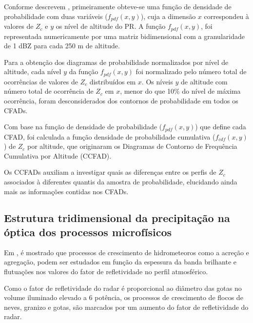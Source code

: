 Conforme descrevem , primeiramente obteve-se uma função de densidade de probabilidade com duas variáveis ($f_{pdf}(x,y)$), cuja a dimensão $x$ correspondeu à valores de $Z_{c}$ e $y$ os nível de altitude do PR. A função $f_{pdf}(x,y)$, foi representada numericamente por uma matriz bidimensional com a granularidade de 1 dBZ para cada 250 m de altitude.



Para a obtenção dos diagramas de probabilidade normalizados por nível de altitude, cada nível $y$ da função $f_{pdf}(x,y)$ foi normalizado pelo número total de ocorrências de valores de $Z_c$ distribuídos em $x$. Os níveis $y$ de altitude com número total de ocorrência de $Z_c$ em $x$, menor do que 10\% do nível de máxima ocorrência, foram desconsiderados dos contornos de probabilidade em todos os CFADs.


Com base na função de densidade de probabilidade ($f_{pdf}(x,y)$) que define cada CFAD, foi calculada a função densidade de probabilidade cumulativa ($f_{cdf}(x,y)$) de $Z_c$ por altitude, que originaram os Diagramas de Contorno de Frequência Cumulativa por Altitude (CCFAD).     



Os CCFADs auxiliam a investigar quais as diferenças entre os perfis de $Z_c$ associados à diferentes quantis da amostra de probabilidade, elucidando ainda mais as informações contidas nos CFADs.


\subsection{Estrutura tridimensional da precipitação na óptica dos processos microfísicos}


Em , é mostrado que processos de crescimento de hidrometeoros como a acreção e agregação, podem ser estudados em função da espessura da banda brilhante e flutuações nos valores do fator de refletividade no perfil atmosférico. 

Como o fator de refletividade do radar é proporcional ao diâmetro das gotas no volume iluminado elevado a 6 potência, os processos de crescimento de flocos de neves, granizo e gotas, são marcados por um aumento do fator de refletividade do radar. 


